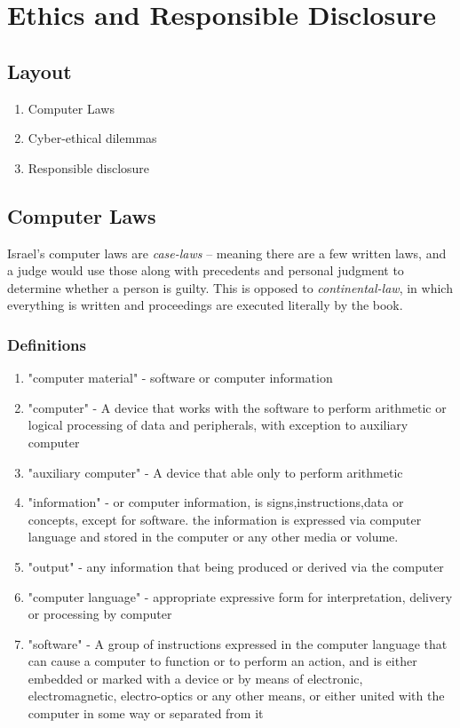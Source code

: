 \chapter{Ethics and Responsible Disclosure} \label{ethics_chapter}

\section*{Layout}

\begin{enumerate}
    \item Computer Laws
    \item Cyber-ethical dilemmas
    \item Responsible disclosure
\end{enumerate}

\section{Computer Laws}\label{sec:comp_laws}

Israel's computer laws are \textit{case-laws} – meaning there are a few written
laws, and a judge would use those along with precedents and personal judgment to
determine whether a person is guilty. This is opposed to
\textit{continental-law}, in which everything is written and proceedings are
executed literally by the book.

\subsection{Definitions}
\begin{enumerate}
    \item "computer material" - software or computer information
    \item "computer" - A device that works with the software to perform arithmetic or logical processing of data and peripherals, with exception to auxiliary computer
    \item "auxiliary computer" - A device that able only to perform arithmetic
    \item "information" - or computer information, is signs,instructions,data or concepts, except for software. the information is expressed via computer language and stored in the computer or any other media or volume.
    \item "output" - any information that being produced or derived via the computer
    \item "computer language" - appropriate expressive form for interpretation, delivery or processing by computer
    \item "software" - A group of instructions expressed in the computer language that can cause a computer to function or to perform an action, and is either embedded or marked with a device or by means of electronic, electromagnetic, electro-optics or any other means, or either united with the computer in some way or separated from it
\end{enumerate}

